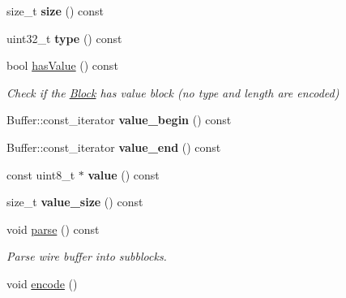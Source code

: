 \begin{DoxyCompactItemize}
\item 
size\+\_\+t {\bfseries size} () const\hypertarget{classndn_1_1Block_a44474fd4ad6b2af883404ffe927b6c6d}{}\label{classndn_1_1Block_a44474fd4ad6b2af883404ffe927b6c6d}

\item 
uint32\+\_\+t {\bfseries type} () const\hypertarget{classndn_1_1Block_a2ad4ad43c0cdafcb0310dcef9a7f5829}{}\label{classndn_1_1Block_a2ad4ad43c0cdafcb0310dcef9a7f5829}

\item 
bool \hyperlink{classndn_1_1Block_ae930b8bee844ef303bb79ba73edb1e1e}{has\+Value} () const\hypertarget{classndn_1_1Block_ae930b8bee844ef303bb79ba73edb1e1e}{}\label{classndn_1_1Block_ae930b8bee844ef303bb79ba73edb1e1e}

\begin{DoxyCompactList}\small\item\em Check if the \hyperlink{classndn_1_1Block}{Block} has value block (no type and length are encoded) \end{DoxyCompactList}\item 
Buffer\+::const\+\_\+iterator {\bfseries value\+\_\+begin} () const\hypertarget{classndn_1_1Block_a8066c2fae25b22a8645cc5bee959b7b1}{}\label{classndn_1_1Block_a8066c2fae25b22a8645cc5bee959b7b1}

\item 
Buffer\+::const\+\_\+iterator {\bfseries value\+\_\+end} () const\hypertarget{classndn_1_1Block_a5ff4750860c848f9aa30ac6e30cae065}{}\label{classndn_1_1Block_a5ff4750860c848f9aa30ac6e30cae065}

\item 
const uint8\+\_\+t $\ast$ {\bfseries value} () const\hypertarget{classndn_1_1Block_acdc228e2f7e54c48b4dc39ca5d23cc54}{}\label{classndn_1_1Block_acdc228e2f7e54c48b4dc39ca5d23cc54}

\item 
size\+\_\+t {\bfseries value\+\_\+size} () const\hypertarget{classndn_1_1Block_a5bb6c627f7e3d54fd9edb5f1036c58e3}{}\label{classndn_1_1Block_a5bb6c627f7e3d54fd9edb5f1036c58e3}

\item 
void \hyperlink{classndn_1_1Block_ad0639ee88657cf843974fc265c137816}{parse} () const
\begin{DoxyCompactList}\small\item\em Parse wire buffer into subblocks. \end{DoxyCompactList}\item 
void \hyperlink{classndn_1_1Block_a7e59e477411c399e1bbc59e27ccef50c}{encode} ()\hypertarget{classndn_1_1Block_a7e59e477411c399e1bbc59e27ccef50c}{}\label{classndn_1_1Block_a7e59e477411c399e1bbc59e27ccef50c}


\end{DoxyCompactItemize}
